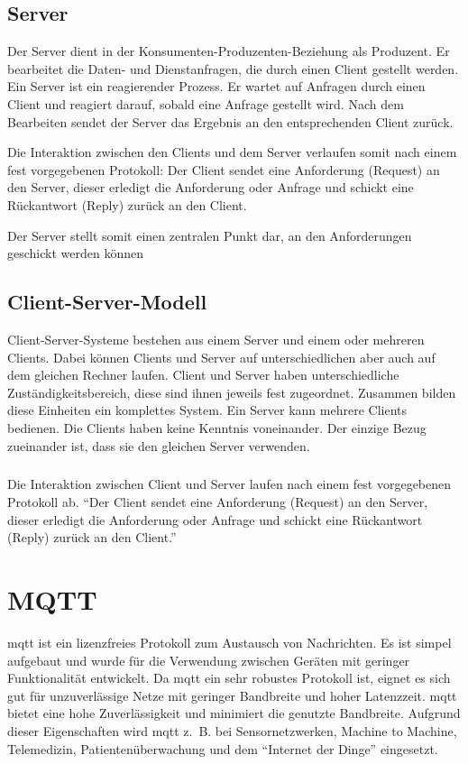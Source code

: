 \subsection{Server}
Der Server dient in der Konsumenten-Produzenten-Beziehung als Produzent. Er
bearbeitet die Daten- und Dienstanfragen, die durch einen Client gestellt
werden. Ein Server ist ein reagierender Prozess. Er wartet auf Anfragen durch
einen Client und reagiert darauf, sobald eine Anfrage gestellt wird. Nach dem
Bearbeiten sendet der Server das Ergebnis an den entsprechenden Client zurück.

Die Interaktion zwischen den Clients und
dem Server verlaufen somit nach einem fest vorgegebenen Protokoll: Der Client
sendet eine Anforderung (Request) an den Server, dieser erledigt die Anforderung
oder Anfrage und schickt eine Rückantwort (Reply) zurück an den Client.

Der Server stellt somit einen zentralen Punkt dar, an den Anforderungen
geschickt werden können
\cite{Bengel2015}

\subsection{Client-Server-Modell}
Client-Server-Systeme bestehen aus einem Server und einem oder mehreren Clients.
Dabei können Clients und Server auf unterschiedlichen aber auch auf dem gleichen
Rechner laufen. Client und Server haben unterschiedliche Zuständigkeitsbereich,
diese sind ihnen jeweils fest zugeordnet. Zusammen bilden diese Einheiten ein
komplettes System. Ein Server kann mehrere Clients bedienen. Die Clients haben
keine Kenntnis voneinander. Der einzige Bezug zueinander ist, dass sie den
gleichen Server verwenden.

\subparagraph{}
Die Interaktion zwischen Client und Server laufen nach einem fest vorgegebenen
Protokoll ab. "`Der Client sendet eine Anforderung (Request) an den Server,
dieser erledigt die Anforderung oder Anfrage und schickt eine Rückantwort
(Reply) zurück an den Client."'
\cite{Bengel2015}

\section{MQTT}\label{sec:mqtt}
\ac{mqtt} ist ein lizenzfreies Protokoll zum Austausch von Nachrichten. Es ist
simpel aufgebaut und wurde für die Verwendung zwischen Geräten mit geringer
Funktionalität entwickelt. Da \ac{mqtt} ein sehr robustes Protokoll ist, eignet
es sich gut für unzuverlässige Netze mit geringer Bandbreite und hoher
Latenzzeit. \ac{mqtt} bietet eine hohe Zuverlässigkeit und minimiert die
genutzte Bandbreite. Aufgrund dieser Eigenschaften wird \ac{mqtt} z.~B.
bei Sensornetzwerken, Machine to Machine, Telemedizin, Patientenüberwachung und
dem "`Internet der Dinge"' eingesetzt.

